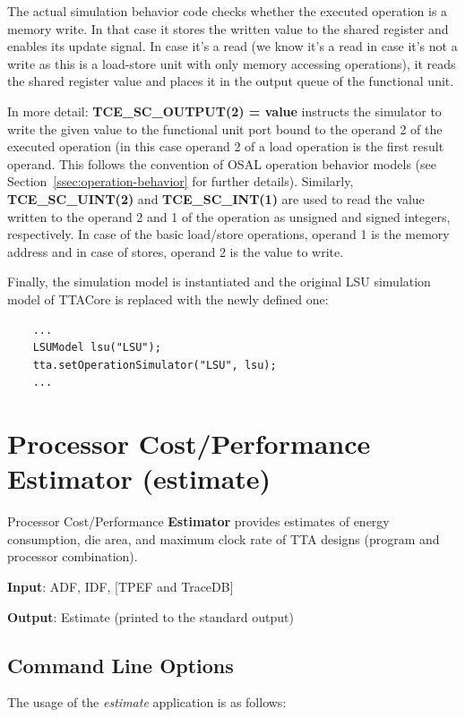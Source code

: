 \documentclass[twoside]{tceusermanual}
\begin{document}
The actual simulation behavior code checks whether the executed
operation is a memory write. In that case it stores the written value 
to the shared register and enables its update signal. In case it's
a read (we know it's a read in case it's not a write as this is a
load-store unit with only memory accessing operations), it reads the
shared register value and places it in the output queue of the
functional unit. 

In more detail: \textbf{TCE\_SC\_OUTPUT(2) = value} instructs
the simulator to write the given value to the functional unit port
bound to the operand 2 of the executed operation (in this case operand 2
of a load operation is the first result operand. This follows the
convention of OSAL operation behavior models (see Section~\ref{ssec:operation-behavior}
for further details). Similarly, \textbf{TCE\_SC\_UINT(2)} and 
\textbf{TCE\_SC\_INT(1)}
are used to read the value written to the operand 2 and 1 of the
operation as unsigned and signed integers, respectively. In case of 
the basic load/store operations, operand 1 is the memory address and in 
case of stores, operand 2 is the value to write.

Finally, the simulation model is instantiated and the original LSU 
simulation model of TTACore is replaced with the newly defined one:

\begin{verbatim}
    ...
    LSUModel lsu("LSU");
    tta.setOperationSimulator("LSU", lsu);
    ...
\end{verbatim}


\section{Processor Cost/Performance Estimator (estimate)}
\label{section:estimate}

Processor Cost/Performance \textbf{Estimator} provides estimates of energy
consumption, die area, and maximum clock rate of TTA designs (program and
processor combination).

\textbf{Input}: ADF, IDF, [TPEF and TraceDB]

\textbf{Output}: Estimate (printed to the standard output)

\subsection{Command Line Options}

The usage of the \emph{estimate} application is as follows:
\end{document}
